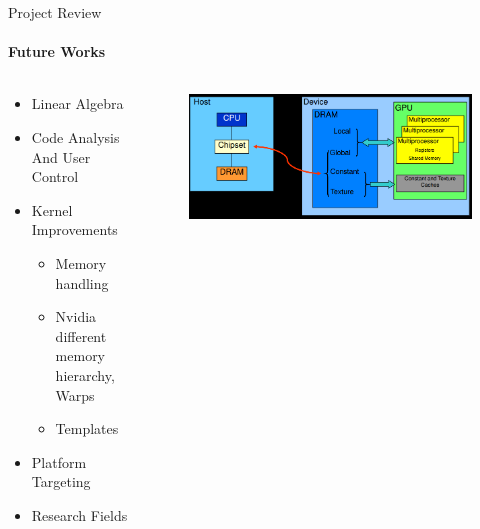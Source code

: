 	\begin{frame}[t]{Project Review}\framesubtitle{Future Works}
	\begin{columns}[T]
	\begin{column}{0.48\textwidth}
		\begin{itemize}
			\item Linear Algebra
			\item Code Analysis And User Control
			\item Kernel Improvements
			\begin{itemize}
				\item Memory handling
				\item Nvidia different memory hierarchy, Warps
				\item Templates
			\end{itemize}
			\item Platform Targeting
			\item Research Fields
		\end{itemize}
	\end{column}
	\begin{column}{.48\textwidth}
      \begin{figure}
         \includegraphics[width=1\textwidth]{images/GPUMemoryClear.png}
      \end{figure}
    \end{column}
    \end{columns}
	\end{frame}

